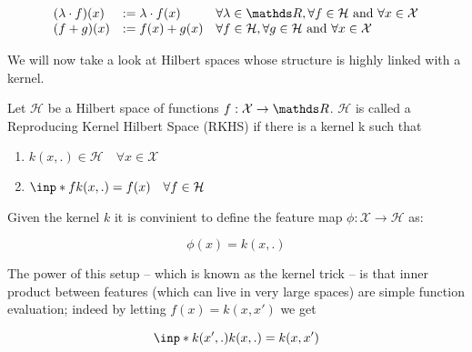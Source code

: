 \begin{equation}
    \begin{array}{lll}
    (\lambda \cdot f)(x) & :=\lambda \cdot f(x) & \forall \lambda \in \R, \forall f \in \mathcal{H} \text { and } \forall x \in \mathcal{X} \\
    (f+g)(x) & :=f(x)+g(x) & \forall f \in \mathcal{H}, \forall g \in \mathcal{H} \text { and } \forall x \in \mathcal{X}
    \end{array}
\end{equation}





We will now take a look at Hilbert spaces whose structure is highly linked with a kernel.

\begin{definition}
    Let $\mathcal{H}$ be a Hilbert space of functions $f: \mathcal{X} \rightarrow \R$. 
    $\mathcal{H}$ is called a Reproducing Kernel Hilbert Space (RKHS) if there is a kernel k such that

    \begin{enumerate}
        \item $ k(x, .) \in \mathcal{H} \quad \forall x \in \mathcal{X}$
        \item $ \inp*{f}{k(x, .)} = f(x) \quad \forall f \in \mathcal{H}$
    \end{enumerate}

\end{definition}

Given the kernel $k$ it is convinient to define the feature map $\phi: \mathcal{X} \rightarrow \mathcal{H}$ as:

$$
    \phi(x) = k(x, .)
$$

The power of this setup -- which is known as the kernel trick -- is that inner product between
features (which can live in very large spaces) are simple function evaluation; 
indeed by letting $f(x) = k(x, x\prime)$ we get

$$
    \inp*{k(x^\prime, .)}{k(x, .)} = k(x, x^\prime)
$$

